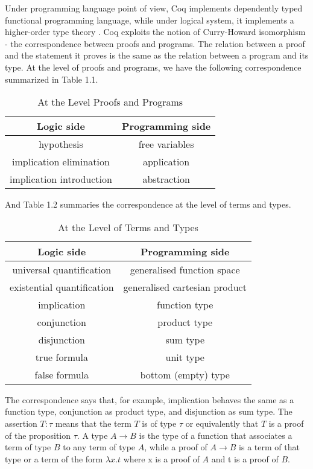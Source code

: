 Under programming language point of view, Coq implements dependently
typed functional programming language, while under logical system, it
implements a higher-order type theory \cite{bertot2004coq}. Coq exploits the notion of Curry-Howard isomorphism - the correspondence between proofs and
programs. The relation between a proof and the statement it proves is
the same as the relation between a program and its type. At the level
of proofs and programs, we have the following correspondence
summarized in Table 1.1.
\begin{table}[h!]
\begin{center}
	\begin{tabular}{|c|c|}
		\hline
		Logic side & Programming side \\ \hline  \hline
		hypothesis & free variables \\ \hline
		implication elimination & application \\ \hline
		implication introduction & abstraction \\ \hline
	\end{tabular}
\end{center}
\caption{At the Level Proofs and Programs }
\end{table}

And Table 1.2 summaries the correspondence at the level of terms and types.
\begin{table}[h!]
\begin{center}
	\begin{tabular}{|c|c|}
		\hline
			Logic side & Programming side \\ \hline 
			universal quantification & generalised function space \\ \hline
			existential quantification & generalised cartesian product \\ \hline
			implication	& function type \\ \hline
			conjunction	& product type \\ \hline
			disjunction	& sum type \\ \hline
			true formula & unit type \\ \hline
			false formula & bottom (empty) type \\ \hline
	\end{tabular}
\end{center}
\caption{At the Level of Terms and Types}
\end{table}
The correspondence says that, for example, implication behaves the same as a
function type, conjunction as product type, and disjunction as sum
type. %
The assertion $T:\tau$ means that the term $T$ is of type $\tau$ or
equivalently that $T$ is a proof of the proposition $\tau$.   A type $A \rightarrow B$
is the type of a function that associates  a term of type $B$ to any
term of type $A$, while a proof of $A \rightarrow B$ is a term of that
type or a term of the form $\lambda x.t$ where x is a proof of $A$ and
t is a proof of $B$. 

